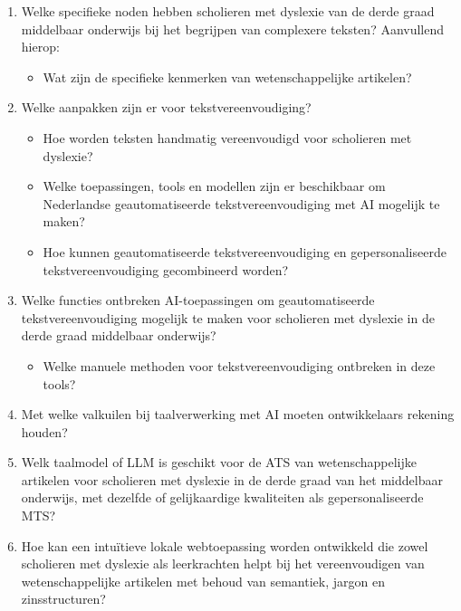 \begin{enumerate}
	\item Welke specifieke noden hebben scholieren met dyslexie van de derde graad middelbaar onderwijs bij het begrijpen van complexere teksten? Aanvullend hierop: 
	\begin{itemize}
		\item Wat zijn de specifieke kenmerken van wetenschappelijke artikelen?
	\end{itemize} 
	\item Welke aanpakken zijn er voor tekstvereenvoudiging?
	\begin{itemize}
		\item Hoe worden teksten handmatig vereenvoudigd voor scholieren met dyslexie?
		\item Welke toepassingen, tools en modellen zijn er beschikbaar om Nederlandse geautomatiseerde tekstvereenvoudiging met AI mogelijk te maken?
		\item Hoe kunnen geautomatiseerde tekstvereenvoudiging en gepersonaliseerde tekstvereenvoudiging gecombineerd worden?
	\end{itemize}
	\item Welke functies ontbreken AI-toepassingen om geautomatiseerde tekstvereenvoudiging mogelijk te maken voor scholieren met dyslexie in de derde graad middelbaar onderwijs? 
	\begin{itemize}
		\item Welke manuele methoden voor tekstvereenvoudiging ontbreken in deze tools?
	\end{itemize}
	\item Met welke valkuilen bij taalverwerking met AI moeten ontwikkelaars rekening houden?
	\item Welk taalmodel of LLM is geschikt voor de ATS van wetenschappelijke artikelen voor scholieren met dyslexie in de derde graad van het middelbaar onderwijs, met dezelfde of gelijkaardige kwaliteiten als gepersonaliseerde MTS?
	\item Hoe kan een intuïtieve lokale webtoepassing worden ontwikkeld die zowel scholieren met dyslexie als leerkrachten helpt bij het vereenvoudigen van wetenschappelijke artikelen met behoud van semantiek, jargon en zinsstructuren?
\end{enumerate}


\section{}%
\label{sec:onderzoeksdoelstelling}

